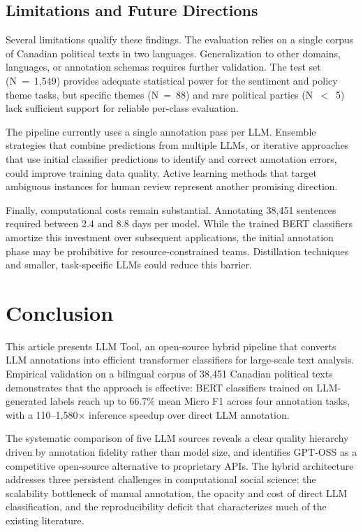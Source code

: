 \documentclass[12pt]{article}
\begin{document}
\subsection{Limitations and Future Directions}

Several limitations qualify these findings. The evaluation relies on a single corpus of Canadian political texts in two languages. Generalization to other domains, languages, or annotation schemas requires further validation. The test set (N~=~1,549) provides adequate statistical power for the sentiment and policy theme tasks, but specific themes (N~=~88) and rare political parties (N~$<$~5) lack sufficient support for reliable per-class evaluation.

The pipeline currently uses a single annotation pass per LLM. Ensemble strategies that combine predictions from multiple LLMs, or iterative approaches that use initial classifier predictions to identify and correct annotation errors, could improve training data quality. Active learning methods that target ambiguous instances for human review represent another promising direction.

Finally, computational costs remain substantial. Annotating 38,451 sentences required between 2.4 and 8.8 days per model. While the trained BERT classifiers amortize this investment over subsequent applications, the initial annotation phase may be prohibitive for resource-constrained teams. Distillation techniques and smaller, task-specific LLMs could reduce this barrier.

\section{Conclusion}

This article presents LLM Tool, an open-source hybrid pipeline that converts LLM annotations into efficient transformer classifiers for large-scale text analysis. Empirical validation on a bilingual corpus of 38,451 Canadian political texts demonstrates that the approach is effective: BERT classifiers trained on LLM-generated labels reach up to 66.7\% mean Micro F1 across four annotation tasks, with a 110--1,580$\times$ inference speedup over direct LLM annotation.

The systematic comparison of five LLM sources reveals a clear quality hierarchy driven by annotation fidelity rather than model size, and identifies GPT-OSS as a competitive open-source alternative to proprietary APIs. The hybrid architecture addresses three persistent challenges in computational social science: the scalability bottleneck of manual annotation, the opacity and cost of direct LLM classification, and the reproducibility deficit that characterizes much of the existing literature.
\end{document}
